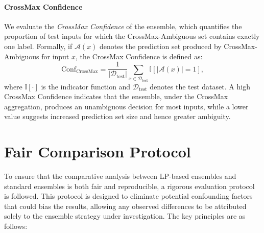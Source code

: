 \paragraph{CrossMax Confidence}
\label{sec:crossmax confidence}
We evaluate the \emph{CrossMax Confidence} of the ensemble, which quantifies the proportion of test inputs for which the CrossMax-Ambiguous set contains exactly one label.  
Formally, if $\mathcal{A}(x)$ denotes the prediction set produced by CrossMax-Ambiguous for input $x$, the CrossMax Confidence is defined as:
\[
\text{Conf}_{\text{CrossMax}} = \frac{1}{|\mathcal{D}_{\text{test}}|} \sum_{x \in \mathcal{D}_{\text{test}}} \mathbb{I}\left[|\mathcal{A}(x)| = 1\right],
\]
where $\mathbb{I}[\cdot]$ is the indicator function and $\mathcal{D}_{\text{test}}$ denotes the test dataset.
A high CrossMax Confidence indicates that the ensemble, under the CrossMax aggregation, produces an unambiguous decision for most inputs, while a lower value suggests increased prediction set size and hence greater ambiguity.



\section{Fair Comparison Protocol}
\indent

To ensure that the comparative analysis between LP-based ensembles and standard ensembles is both fair and reproducible, a rigorous evaluation protocol is followed. This protocol is designed to eliminate potential confounding factors that could bias the results, allowing any observed differences to be attributed solely to the ensemble strategy under investigation. The key principles are as follows:

